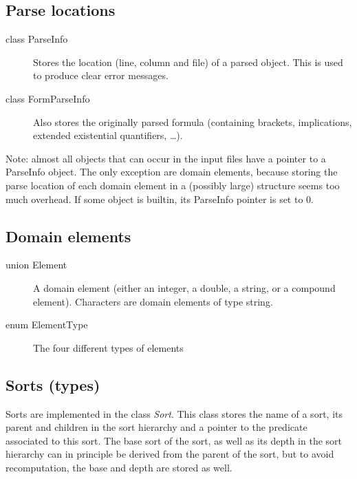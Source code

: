\documentclass{article}
\begin{document}
\subsection*{Parse locations}

\begin{description}
	\item[class ParseInfo] Stores the location (line, column and file) of a parsed object. This is used to produce clear error messages.
	\item[class FormParseInfo] Also stores the originally parsed formula (containing brackets, implications, extended existential quantifiers, \ldots). 
\end{description}
Note: almost all objects that can occur in the input files have a pointer to a ParseInfo object. The only exception are domain elements, because storing the parse location of each domain element in a (possibly large) structure seems too much overhead. If some object is builtin, its ParseInfo pointer is set to 0.

\subsection*{Domain elements}

\begin{description}
	\item[union Element] A domain element (either an integer, a double, a string, or a compound element). Characters are domain elements of type string.  
	\item[enum ElementType] The four different types of elements
\end{description}

\subsection*{Sorts (types)}

Sorts are implemented in the class \emph{Sort}. This class stores the name of a sort, its parent and children in the sort hierarchy and a pointer to the predicate associated to this sort. The base sort of the sort, as well as its depth in the sort hierarchy can in principle be derived from the parent of the sort, but to avoid recomputation, the base and depth are stored as well.
\end{document}
